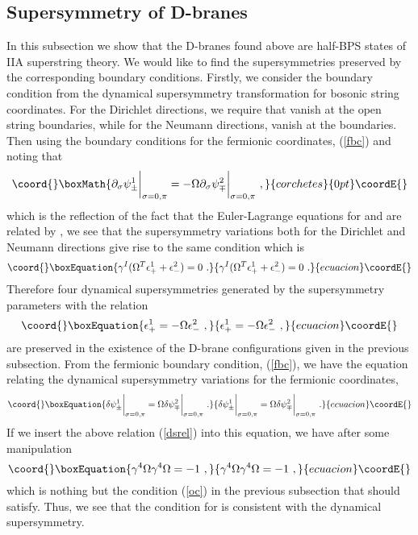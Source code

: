 \documentclass[a4paper,12pt]{article}
\begin{document}
\subsection{Supersymmetry of D-branes}

In this subsection we show that the D-branes found above are half-BPS
states of IIA superstring theory.  We would like to find the
supersymmetries preserved by the corresponding boundary conditions.
Firstly, we consider the boundary condition from the dynamical
supersymmetry transformation for bosonic string coordinates. For the
Dirichlet directions, we require that \coordHE{} vanish at the
open string boundaries, while for the Neumann directions, \coordHE{} vanish at the boundaries.  Then using the
boundary conditions for the fermionic coordinates, (\ref{fbc}) and
noting that
\[\coord{}\boxMath{
\partial_\sigma \psi^1_\pm \bigg|_{\sigma = 0,\pi}
= - \Omega \partial_\sigma \psi^2_\mp \bigg|_{\sigma=0, \pi}~,
}{corchetes}{0pt}\coordE{}\]
which is the reflection of the fact that the Euler-Lagrange equations
for \coordHE{} and \coordHE{} are related by \myHighlight{$\sigma \leftrightarrow -
\sigma$}\coordHE{} \cite{lam031}, we see that the supersymmetry variations both
for the Dirichlet and Neumann directions give rise to the same
condition which is
\begin{equation}\coord{}\boxEquation{
\gamma^I ( \Omega^T \epsilon^1_+ + \epsilon^2_-) = 0 ~.
}{
\gamma^I ( \Omega^T \epsilon^1_+ + \epsilon^2_-) = 0 ~.
}{ecuacion}\coordE{}\end{equation}
Therefore four dynamical supersymmetries generated by the
supersymmetry parameters with the relation
\begin{equation}\coord{}\boxEquation{
\epsilon^1_+ = - \Omega \epsilon^2_-~,
\label{dsrel}
}{
\epsilon^1_+ = - \Omega \epsilon^2_-~,
}{ecuacion}\coordE{}\end{equation}
are preserved in the existence of the D-brane configurations given in
the previous subsection.  From the fermionic boundary condition,
(\ref{fbc}), we have the equation relating the dynamical supersymmetry
variations for the fermionic coordinates,
\begin{equation}\coord{}\boxEquation{
\delta \psi^1_\pm \bigg|_{\sigma = 0, \pi}
 = \Omega \delta \psi^2_\mp \bigg|_{\sigma=0, \pi} ~.
}{
\delta \psi^1_\pm \bigg|_{\sigma = 0, \pi}
 = \Omega \delta \psi^2_\mp \bigg|_{\sigma=0, \pi} ~.
}{ecuacion}\coordE{}\end{equation}
If we insert the above relation (\ref{dsrel}) into this equation, we
have after some manipulation
\begin{equation}\coord{}\boxEquation{
\gamma^4 \Omega \gamma^4 \Omega = -1 ~,
\label{omega}
}{
\gamma^4 \Omega \gamma^4 \Omega = -1 ~,
}{ecuacion}\coordE{}\end{equation}
which is nothing but the condition (\ref{oc}) in the previous
subsection that \myHighlight{$\Omega$}\coordHE{} should satisfy.  Thus, we see that the
condition for \myHighlight{$\Omega$}\coordHE{} is consistent with the dynamical supersymmetry.
 
\end{document}
